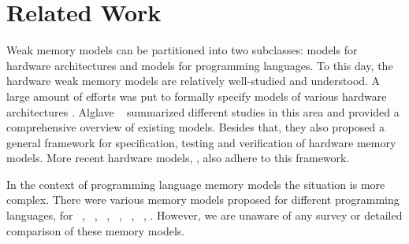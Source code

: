 \section{Related Work}
\label{sec:related}

Weak memory models can be partitioned into two subclasses: 
models for hardware architectures and models for programming languages. 
To this day, the hardware weak memory models are relatively well-studied and understood.
A large amount of efforts was put to formally specify models of various 
hardware architectures%
\cite{Chong-ASPLOS08, Alglave-DAMP09, Sewell-al:CACM10, Sarkar-al:PLDI11}.
Alglave \etal~\cite{Alglave-al:TOPLAS14} summarized different studies in this area 
and provided a comprehensive overview of existing models.  
Besides that, they also proposed a general framework for specification, 
testing and verification of hardware memory models.
More recent hardware models, \eg \cite{Pulte-al:POPL18}, 
also adhere to this framework.   

In the context of programming language memory models the situation is more complex. 
There were various memory models proposed for different programming languages, \eg
for \Java~\cite{Manson-al:POPL05, Bender-Palsberg:OOPSLA19}, \CPP~\cite{Batty-al:POPL11}, 
\LLVM~\cite{Chakraborty-Vafeiadis:CGO17}, \JS~\cite{Watt-al:PLDI2020}, 
\OCaml~\cite{Manson-al:POPL05}, \Haskell~\cite{Vollmer-al:PPoPP17}, \etc. 
However, we are unaware of any survey or detailed comparison of these memory models.


